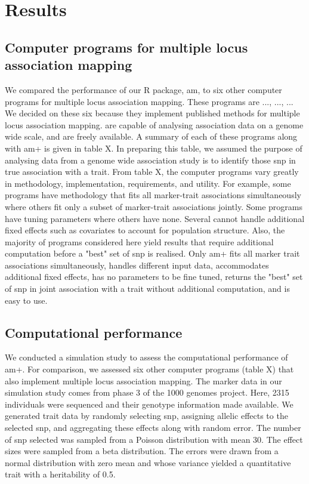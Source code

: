 \documentclass[12pt]{article}
\begin{document}
\section{Results}


\subsection{Computer programs for   multiple locus association mapping}

We compared the performance of our R package, am, to six other computer programs for multiple locus association mapping. These programs are ..., ..., ... We decided on these six because they implement published methods for multiple locus association mapping.  are capable of analysing association data on a genome wide scale, and are freely available. A summary of each of these programs along with am+ is given in table X. In preparing this table, we assumed the purpose of analysing data from a genome wide association study is to identify those snp in true association with a trait.  From table X, the computer programs vary greatly in methodology, implementation, requirements, and utility.  For example, some programs have methodology that fits all marker-trait associations simultaneously where others  fit only a subset of marker-trait associations jointly. Some programs have tuning parameters where others have none. Several cannot handle additional fixed effects such as covariates to account for population structure. Also, the majority of programs considered here yield results that require additional computation before a "best" set of snp is realised. Only am+  fits all marker trait associations simultaneously, handles different input data, accommodates additional fixed effects, has no parameters to be fine tuned, returns the "best" set of snp in joint association with a trait without additional computation, and is easy to use. 



\subsection{Computational performance}
We conducted a simulation study to assess  the computational performance of am+. For comparison, we assessed six other computer programs (table X) that  also implement multiple locus association mapping. The marker data in our simulation study comes from phase 3 of the 1000 genomes project. Here, 2315 individuals were sequenced and their genotype information made available. We generated trait data by randomly selecting snp, assigning allelic  effects to the selected snp, and aggregating these effects along with random error. The number of snp  selected  was sampled from a Poisson distribution with mean 30. The effect sizes were sampled from a beta distribution. The errors were drawn from a normal distribution with zero mean and whose variance yielded a quantitative trait with a heritability of 0.5.
\end{document}
